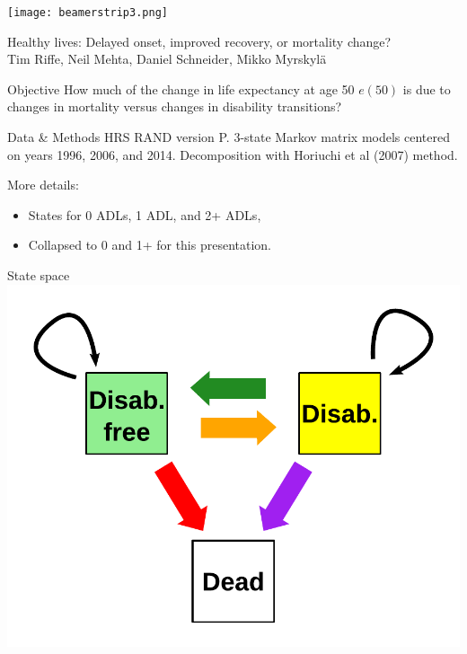 \documentclass[20pt,usenames,dvipsnames]{beamer}
\begin{document}

\begin{frame}[plain]
	\vspace{-3cm}
 \centerline{\texttt{[image: beamerstrip3.png]}}

	
	\huge
	\vspace{1em}
	
	Healthy lives: Delayed onset, improved recovery, or mortality
change?\\
	\vspace{1em}
	\large 
	Tim Riffe, Neil Mehta, Daniel Schneider, Mikko Myrskyl\"a 
\end{frame}
\begin{frame}[plain]
\Large
\begin{block}{Objective}
How much of the change in life expectancy at age 50 $e(50)$ is due to changes in mortality versus changes in disability transitions?
\end{block}
\end{frame}
\begin{frame}[plain]
\Large
\begin{block}{Data \& Methods}
HRS RAND version P. 3-state Markov matrix models centered on years 1996, 2006, and 2014. Decomposition with Horiuchi et al (2007) method.
\end{block}
\pause
More details:
\begin{itemize}
\item States for 0 ADLs, 1 ADL, and 2+ ADLs, 
\item Collapsed to 0 and 1+ for this presentation.
\end{itemize}
\end{frame}

\begin{frame}[plain]
\Large
\begin{center}
State space
\includegraphics[height=\textheight, keepaspectratio]{Figures/StateSpace.pdf}
\end{center}
\end{frame}
\end{document}
